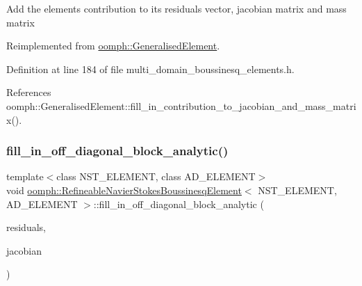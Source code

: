 Add the element\textquotesingle{}s contribution to its residuals vector, jacobian matrix and mass matrix 

Reimplemented from \hyperlink{classoomph_1_1GeneralisedElement_a2b6294a730647cf865da94f2531466f8}{oomph\+::\+Generalised\+Element}.



Definition at line 184 of file multi\+\_\+domain\+\_\+boussinesq\+\_\+elements.\+h.



References oomph\+::\+Generalised\+Element\+::fill\+\_\+in\+\_\+contribution\+\_\+to\+\_\+jacobian\+\_\+and\+\_\+mass\+\_\+matrix().

\mbox{\label{classoomph_1_1RefineableNavierStokesBoussinesqElement_a9609dc454ef3d29b1e256fa32fb2c665}} 
\subsubsection{\texorpdfstring{fill\+\_\+in\+\_\+off\+\_\+diagonal\+\_\+block\+\_\+analytic()}{fill\_in\_off\_diagonal\_block\_analytic()}}
{\footnotesize\ttfamily template$<$class N\+S\+T\+\_\+\+E\+L\+E\+M\+E\+NT, class A\+D\+\_\+\+E\+L\+E\+M\+E\+NT$>$ \\
void \hyperlink{classoomph_1_1RefineableNavierStokesBoussinesqElement}{oomph\+::\+Refineable\+Navier\+Stokes\+Boussinesq\+Element}$<$ N\+S\+T\+\_\+\+E\+L\+E\+M\+E\+NT, A\+D\+\_\+\+E\+L\+E\+M\+E\+NT $>$\+::fill\+\_\+in\+\_\+off\+\_\+diagonal\+\_\+block\+\_\+analytic (\begin{DoxyParamCaption}\item[{\hyperlink{classoomph_1_1Vector}{Vector}$<$ double $>$ \&}]{residuals,  }\item[{\hyperlink{classoomph_1_1DenseMatrix}{Dense\+Matrix}$<$ double $>$ \&}]{jacobian }\end{DoxyParamCaption})\hspace{0.3cm}{\ttfamily [inline]}}



